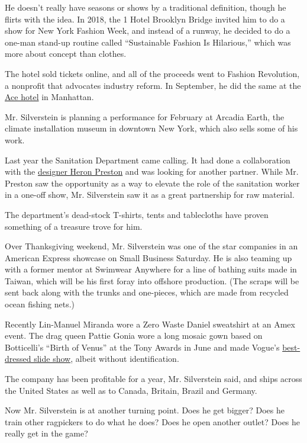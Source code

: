 He doesn't really have seasons or shows by a traditional definition,
though he flirts with the idea. In 2018, the 1 Hotel Brooklyn Bridge
invited him to do a show for New York Fashion Week, and instead of a
runway, he decided to do a one-man stand-up routine called ``Sustainable
Fashion Is Hilarious,'' which was more about concept than clothes.

The hotel sold tickets online, and all of the proceeds went to Fashion
Revolution, a nonprofit that advocates industry reform. In September, he
did the same at the
\href{https://www.papermag.com/zero-waste-daniel-2640345826.html}{Ace
hotel} in Manhattan.

Mr. Silverstein is planning a performance for February at Arcadia Earth,
the climate installation museum in downtown New York, which also sells
some of his work.

Last year the Sanitation Department came calling. It had done a
collaboration with the
\href{https://www.nytimes3xbfgragh.onion/2016/09/10/fashion/new-york-fashion-week-heron-preston.html}{designer
Heron Preston} and was looking for another partner. While Mr. Preston
saw the opportunity as a way to elevate the role of the sanitation
worker in a one-off show, Mr. Silverstein saw it as a great partnership
for raw material.

The department's dead-stock T-shirts, tents and tablecloths have proven
something of a treasure trove for him.

Over Thanksgiving weekend, Mr. Silverstein was one of the star companies
in an American Express showcase on Small Business Saturday. He is also
teaming up with a former mentor at Swimwear Anywhere for a line of
bathing suits made in Taiwan, which will be his first foray into
offshore production. (The scraps will be sent back along with the trunks
and one-pieces, which are made from recycled ocean fishing nets.)

Recently Lin-Manuel Miranda wore a Zero Waste Daniel sweatshirt at an
Amex event. The drag queen Pattie Gonia wore a long mosaic gown based on
Botticelli's ``Birth of Venus'' at the Tony Awards in June and made
Vogue's
\href{https://www.vogue.com/slideshow/best-red-carpet-moments-fashion-tony-awards}{best-dressed
slide show}, albeit without identification.

The company has been profitable for a year, Mr. Silverstein said, and
ships across the United States as well as to Canada, Britain, Brazil and
Germany.

Now Mr. Silverstein is at another turning point. Does he get bigger?
Does he train other ragpickers to do what he does? Does he open another
outlet? Does he really get in the game?

